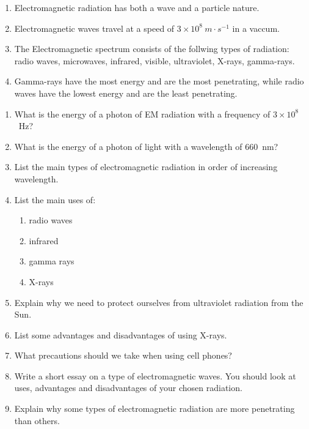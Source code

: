 \begin{enumerate}
\item Electromagnetic radiation has both a wave and a particle nature.
\item Electromagnetic waves travel at a speed of $3 \times 10^{8}~m \cdot s^{-1}$ in a vaccum.
\item The Electromagnetic spectrum consists of the follwing types of radiation: radio waves, microwaves, infrared, visible, ultraviolet, X-rays, gamma-rays.
\item Gamma-rays have the most energy and are the most penetrating, while radio waves have the lowest energy and are the least penetrating.

\end{enumerate}

\begin{eocexercises}
\begin{enumerate}

\item What is the energy of a photon of EM radiation with a frequency of $3 \times 10^{8}$~Hz? 

\item What is the energy of a photon of light with a wavelength of 660~nm?

\item List the main types of electromagnetic radiation in order of increasing wavelength.

\item List the main uses of:
\begin{enumerate}
\item radio waves
\item infrared
\item gamma rays
\item X-rays
\end{enumerate}

\item Explain why we need to protect ourselves from ultraviolet radiation from the Sun.

\item List some advantages and disadvantages of using X-rays.

\item What precautions should we take when using cell phones?

\item Write a short essay on a type of electromagnetic waves. You should look at uses, advantages and disadvantages of your chosen radiation.

\item Explain why some types of electromagnetic radiation are more penetrating than others.

\end{enumerate}


\end{eocexercises}







